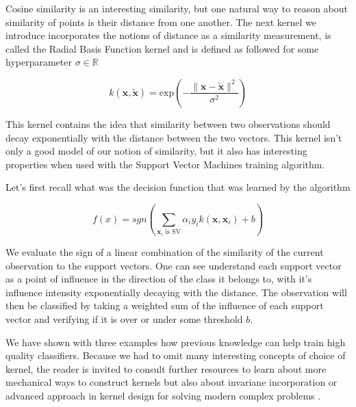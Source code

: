 Cosine similarity is an interesting similarity, but one natural way to reason about similarity of points is their distance from one another. The next kernel we introduce incorporates the notions of distance as a similarity measurement, is called the Radial Basis Function kernel and is defined as followed for some hyperparameter $\sigma \in \mathbb{R}$

\begin{equation*}
  k(\mathbf{x}, \mathbf{\tilde{x}}) = \text{exp}\left(-\frac{\|\mathbf{x} - \mathbf{\tilde{x}}\|^2}{\sigma^2}\right)
\end{equation*}

This kernel contains the idea that similarity between two observations should decay exponentially with the distance between the two vectors. This kernel isn't only a good model of our notion of similarity, but it also has interesting properties when used with the Support Vector Machines training algorithm.

Let's first recall what was the decision function that was learned by the algorithm

\begin{equation*}
  f\left(x\right) = sgn\left(\sum_{\mathbf{x}_i \text{ is SV}}\alpha_iy_ik\left(\mathbf{x}, \mathbf{x}_i\right) + b\right)
\end{equation*}

We evaluate the sign of a linear combination of the similarity of the current observation to the support vectors. One can see understand each support vector as a point of influence in the direction of the class it belongs to, with it's influence intensity exponentially decaying with the distance. The observation will then be classified by taking a weighted sum of the influence of each support vector and verifying if it is over or under some threshold $b$.

We have shown with three examples how previous knowledge can help train high quality classifiers. Because we had to omit many interesting concepts of choice of kernel, the reader is invited to consult further resources to learn about more mechanical ways to construct kernels \cite{Scholkopf:2001:LKS:559923} but also about invariane incorporation \cite{Decoste2002} or advanced approach in kernel design for solving modern complex problems \cite{lauer:hal}.

